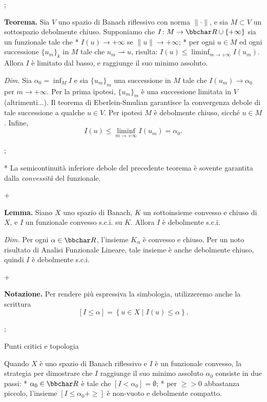 \pg;

{\bf Teorema.} Sia $V$ uno spazio di Banach riflessivo con norma $\|
\cdot \|$, e sia $M \subset V$ un sottospazio debolmente
chiuso. Supponiamo che $I \colon M \to \R \cup \{+\infty\}$ sia un
funzionale tale che
\begitems
* $I(u) \to +\infty$ se $\|u\| \to +\infty$;
* per ogni $u \in M$ ed ogni successione $\{u_m\}_k$ in $M$ tale che
$u_m \rightharpoonup u$, risulta: $I(u) \leq \liminf_{m \to +\infty}
I(u_m)$.
\enditems
Allora $I$ \`e limitato dal basso, e raggiunge il suo minimo assoluto.

\medskip

{\em Dim.} Sia $\alpha_0 = \inf_M I$ e sia $\{u_m\}_m$ una successione
in $M$ tale che $I(u_m) \to \alpha_0$ per $m \to +\infty$. Per la
prima ipotesi, $\{u_m\}_m$ \`e una successione limitata in $V$
(altrimenti...). Il teorema di Eberlein-Smulian garantisce la
convergenza debole di tale successione a qualche $u \in V$. Per
ipotesi $M$ \`e debolmente chiuso, sicch\'e $u \in M$. Infine,
$$
I(u) \leq \liminf_{m \to +\infty} I(u_m) = \alpha_0.
$$

\pg;

* La semicontinuit\`a inferiore debole del precedente teorema \`e
  sovente garantita dalla {\em convessit\`a} del funzionale.

\pg+

{\bf Lemma.} Siano $X$ uno spazio di Banach, $K$ un sottoinsieme
convesso e chiuso di $X$, e $I$ un funzionale convesso s.c.i. su
$K$. Allora $I$ \`e debolmente s.c.i.

\medskip

{\em Dim.} Per ogni $\alpha \in \R$, l'insieme $K_\alpha$ \`e convesso
e chiuso. Per un noto risultato di Analisi Funzionale Lineare, tale
insieme \`e anche debolmente chiuso, quindi $I$ \`e debolmente s.c.i.

\pg+

{\bf Notazione.} Per rendere pi\`u espressiva la simbologia,
utilizzeremo anche la scrittura
$$
[I \leq \alpha] = \left\{ u \in X \mid I(u) \leq \alpha \right\}.
$$

\pg;

\sec Punti critici e topologia

Quando $X$ \`e uno spazio di Banach riflessivo e $I$ \`e un funzionale
convesso, la strategia per dimostrare che $I$ raggiunge il suo minimo
assoluto $\alpha_0$ consiste in due passi:
\begitems
* $\alpha_0 \in \R$ \`e tale che $[I < \alpha_0]=\emptyset$;
* per $\ge>0$ abbastanza piccolo, l'insieme $[I \leq \alpha_0+\ge]$
\`e non-vuoto e debolmente compatto.
\enditems

